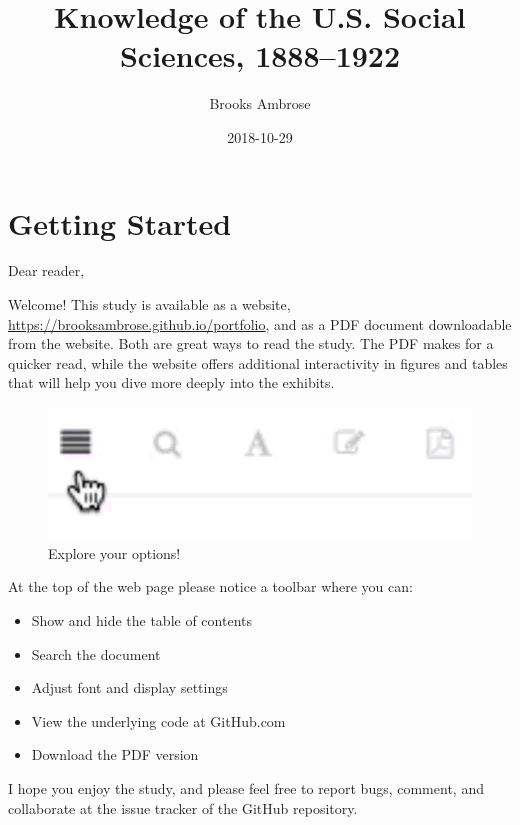 \documentclass[]{book}
\title{Knowledge of the U.S. Social Sciences, 1888--1922}
\author{Brooks Ambrose}
\date{2018-10-29}
\providecommand{\tightlist}{%
  \setlength{\itemsep}{0pt}\setlength{\parskip}{0pt}}
\begin{document}
\maketitle

{
\setcounter{tocdepth}{2}
\tableofcontents
}
\listoftables
\listoffigures
\chapter*{Getting Started}\label{getting-started}


Dear reader,

Welcome! This study is available as a website,
\url{https://brooksambrose.github.io/portfolio}, and as a PDF document
downloadable from the website. Both are great ways to read the study.
The PDF makes for a quicker read, while the website offers additional
interactivity in figures and tables that will help you dive more deeply
into the exhibits.

\begin{figure}

{\centering \includegraphics{img/toolbar} 

}

\caption{Explore your options!}\label{fig:toolbar}
\end{figure}

At the top of the web page please notice a toolbar where you can:

\begin{itemize}
\tightlist
\item
  Show and hide the table of contents
\item
  Search the document
\item
  Adjust font and display settings
\item
  View the underlying code at GitHub.com
\item
  Download the PDF version
\end{itemize}

I hope you enjoy the study, and please feel free to report bugs,
comment, and collaborate at the issue tracker of the GitHub repository.
\end{document}
